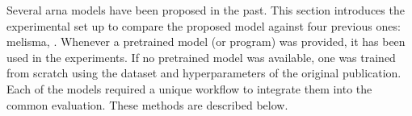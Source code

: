 
Several \gls{arna} models have been proposed in the past.
This section introduces the experimental set up to compare
the proposed model against four previous ones:
\gls{melisma}, \textcite{chen2021attend, micchi2021deep,
mcleod2021modular}. Whenever a pretrained model (or program)
was provided, it has been used in the experiments. If no
pretrained model was available, one was trained from scratch
using the dataset and hyperparameters of the original
publication. Each of the models required a unique workflow
to integrate them into the common evaluation. These methods
are described below. 
